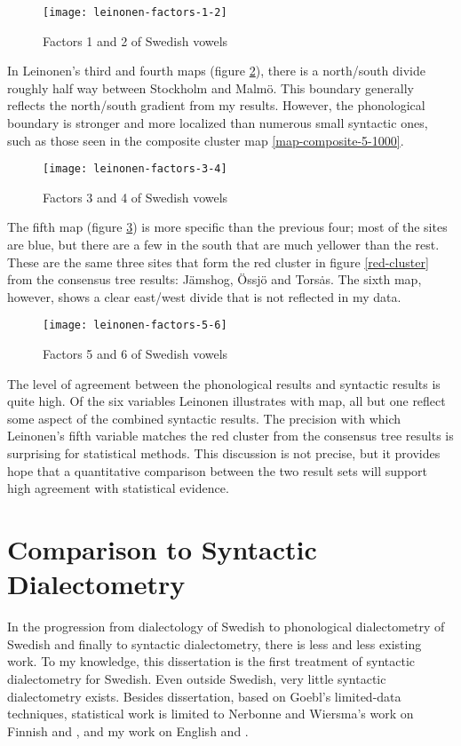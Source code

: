 \begin{figure}
  \texttt{[image: leinonen-factors-1-2]}
  \caption{Factors 1 and 2 of Swedish vowels}
  \label{leinonen-factors-1-2}
\end{figure}

In Leinonen's third and fourth maps (figure \ref{leinonen-factors-3-4}),
there is a north/south divide roughly half way between Stockholm and
Malm\"o. This boundary generally reflects the north/south
gradient from my results. However, the phonological boundary is stronger and more
localized than numerous small syntactic ones, such as those seen in
the composite cluster map \ref{map-composite-5-1000}.

\begin{figure}
  \texttt{[image: leinonen-factors-3-4]}
  \caption{Factors 3 and 4 of Swedish vowels}
  \label{leinonen-factors-3-4}
\end{figure}


The fifth map (figure \ref{leinonen-factors-5-6}) is more specific
than the previous four; most of the sites are blue, but there are a
few in the south that are much yellower than the rest. These are the
same three sites that form the red cluster in
figure \ref{red-cluster} from the consensus tree
results: J\"amshog, \"Ossj\"o and Tors\.as. The sixth map, however,
shows a clear east/west divide that is not reflected in my data.

\begin{figure}
  \texttt{[image: leinonen-factors-5-6]}
  \caption{Factors 5 and 6 of Swedish vowels}
  \label{leinonen-factors-5-6}
\end{figure}

The level of agreement between the phonological results and syntactic
results is quite high. Of the six variables Leinonen illustrates with
map, all but one reflect some aspect of the combined syntactic
results. The precision with which Leinonen's fifth variable matches
the red cluster from the consensus tree results is surprising for
statistical methods. This discussion is not precise, but it provides
hope that a quantitative comparison between the two result sets will
support high agreement with statistical evidence.

\section{Comparison to Syntactic Dialectometry}

In the progression from dialectology of Swedish to phonological
dialectometry of Swedish and finally to syntactic dialectometry, there
is less and less existing work. To my knowledge, this dissertation is
the first treatment of syntactic dialectometry for Swedish. Even
outside Swedish, very little syntactic dialectometry exists. Besides
 dissertation, based on Goebl's limited-data
techniques, statistical work is limited to Nerbonne and Wiersma's work
on Finnish \cite{nerbonne06} and \cite{wiersma09}, and my work on
English \cite{sanders07} and \cite{sanders08b}.

